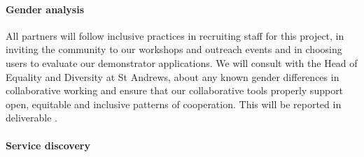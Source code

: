 \paragraph{Gender analysis}

All partners will follow inclusive practices in recruiting staff for this project, in
inviting the community to our workshops and outreach events and in choosing users to
evaluate our demonstrator applications. We will consult with the Head of Equality and
Diversity at St Andrews, about any known gender differences in collaborative working and
ensure that our collaborative tools properly support open, equitable and inclusive
patterns of cooperation. This will be reported in deliverable .

\paragraph{Service discovery}








